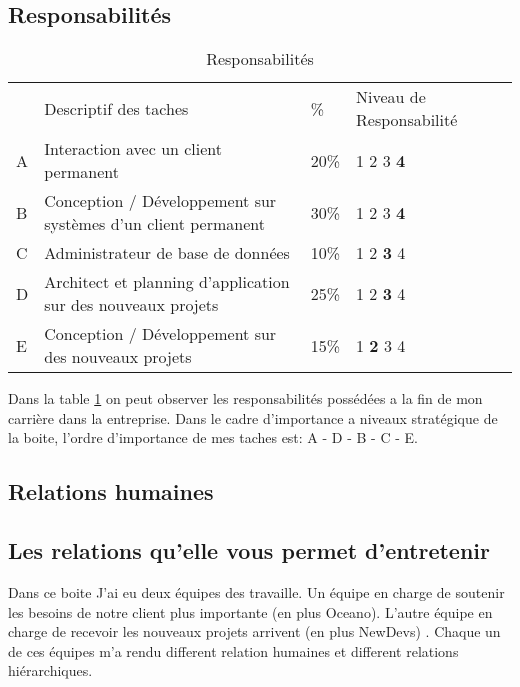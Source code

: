 \documentclass{resume} %
\begin{document}
	\subsection{Responsabilités}
\begin{table}[!htbp]
\label{table-aufiero}
\begin{tabular}{|l|l|l|l|l}
\cline{1-4}
   & Descriptif des taches &  \% & Niveau de Responsabilité \footnotemark &  \\ \cline{1-4}
 A& Interaction avec un client permanent & 20\% & 1 2 3 \textbf{4}  &  \\ \cline{1-4}
 B& Conception / Développement sur systèmes d'un client permanent & 30\%&  1 2 3 \textbf{4} &  \\ \cline{1-4}
 C& Administrateur de base de données  & 10\%  & 1 2 \textbf{3} 4  &  \\ \cline{1-4}
 D& Architect et planning d’application sur des nouveaux projets & 25\% & 1 2 \textbf{3} 4 &  \\ \cline{1-4}
 E& Conception / Développement sur des nouveaux projets & 15\% &1 \textbf{2} 3 4   &  \\ \cline{1-4}
\end{tabular}

\caption{Responsabilités}
\end{table}
Dans la table \ref{table-aufiero}  on peut observer les responsabilités possédées a la fin de mon carrière dans la entreprise.
Dans le cadre d'importance a niveaux stratégique de la boite, l'ordre d'importance de mes taches est: A - D - B - C - E. 


\subsection{Relations humaines}
	\subsection{Les relations qu'elle vous permet d'entretenir}
	Dans ce boite J'ai eu deux équipes des travaille. Un équipe en charge de soutenir les besoins de notre client plus importante (en plus Oceano). L'autre équipe en charge de recevoir les nouveaux projets arrivent (en plus NewDevs)  . 
	Chaque un de ces équipes m'a rendu different relation humaines et different relations hiérarchiques.  
	
\end{document}

